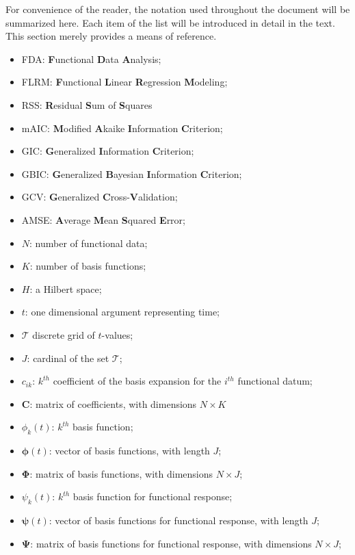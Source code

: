 For convenience of the reader, the notation used throughout the document will be summarized here. Each item of the list will be introduced in detail in the text. This section merely provides a means of reference.
\begin{itemize}
\item FDA: \textbf{F}unctional \textbf{D}ata \textbf{A}nalysis;
\item FLRM: \textbf{F}unctional \textbf{L}inear \textbf{R}egression \textbf{M}odeling;
\item RSS: \textbf{R}esidual \textbf{S}um of \textbf{S}quares
\item mAIC: \textbf{M}odified \textbf{A}kaike \textbf{I}nformation \textbf{C}riterion;
\item GIC: \textbf{G}eneralized \textbf{I}nformation \textbf{C}riterion;
\item GBIC: \textbf{G}eneralized \textbf{B}ayesian \textbf{I}nformation \textbf{C}riterion;
\item GCV: \textbf{G}eneralized \textbf{C}ross-\textbf{V}alidation;
\item AMSE: \textbf{A}verage \textbf{M}ean \textbf{S}quared \textbf{E}rror;
\item $N$: number of functional data;
\item $K$: number of basis functions;
\item $H$: a Hilbert space;
\item $t$: one dimensional argument representing time;
\item $\mathcal{T}$ discrete grid of $t$-values;
\item $J$: cardinal of the set $\mathcal{T}$;
\item $c_{ik}$: $k^{th}$ coefficient of the basis expansion for the $i^{th}$ functional datum;
\item $\bm{C}$: matrix of coefficients, with dimensions $N \times K$
\item $\phi_k(t)$: $k^{th}$ basis function;
\item $\bm{\phi}(t)$: vector of basis functions, with length $J$;
\item $\bm{\Phi}$: matrix of basis functions, with dimensions $N \times J$;
\item $\psi_k(t)$: $k^{th}$ basis function for functional response;
\item $\bm{\psi}(t)$: vector of basis functions for functional response, with length $J$;
\item $\bm{\Psi}$: matrix of basis functions for functional response, with dimensions $N \times J$;

\end{itemize}
